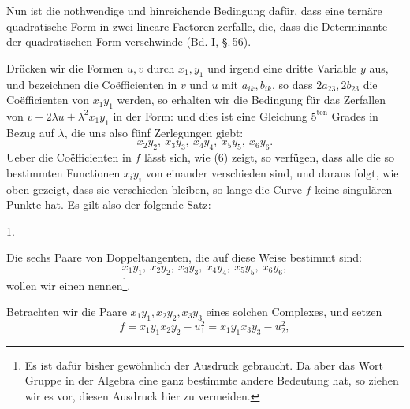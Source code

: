 Nun ist die nothwendige und hinreichende Bedingung dafür, dass eine ternäre quadratische Form in zwei lineare Factoren zerfalle, die, dass die Determinante der quadratischen Form verschwinde (Bd. I, \S.\,56).

Drücken wir die Formen $u, v$ durch $x_1, y_1$ und irgend eine dritte Variable $y$ aus, und bezeichnen die Co\"efficienten in $v$ und $u$ mit $a_{ik}, b_{ik}$, so dass $2a_{23}, 2b_{23}$ die Co\"efficienten von $x_1 y_1$ werden, so erhalten wir die Bedingung für das Zerfallen von $v + 2\lambda u + \lambda^2 x_1 y_1$ in der Form:
und dies ist eine Gleichung $5^{\mathrm{ten}}$ Grades in Bezug auf $\lambda$, die uns also fünf Zerlegungen giebt:
\[
x_2 y_2,\ x_3 y_3,\ x_4 y_4,\ x_5 y_5,\ x_6 y_6.
\]
Ueber die Co\"efficienten in $f$ lässt sich, wie (6) zeigt, so verfügen, dass alle die so bestimmten Functionen $x_i y_i$ von einander verschieden sind, und daraus folgt, wie oben gezeigt, dass sie verschieden bleiben, so lange die Curve $f$ keine singulären Punkte hat. Es gilt also der folgende Satz:

1. 

Die sechs Paare von Doppeltangenten, die auf diese Weise bestimmt sind:
\[
x_1 y_1,\ x_2 y_2,\ x_3 y_3,\ x_4 y_4,\ x_5 y_5,\ x_6 y_6,
\]
wollen wir einen  nennen\footnote{Es ist dafür bisher gewöhnlich der Ausdruck  gebraucht. Da aber das Wort \glqq Gruppe\grqq{} in der Algebra eine ganz bestimmte andere Bedeutung hat, so ziehen wir es vor, diesen Ausdruck hier zu vermeiden.}.

Betrachten wir die Paare $x_1 y_1, x_2 y_2, x_3 y_3$ eines solchen Complexes, und setzen
\[
f = x_1 y_1 x_2 y_2 - u_1^2 = x_1 y_1 x_3 y_3 - u_2^2,
\]
